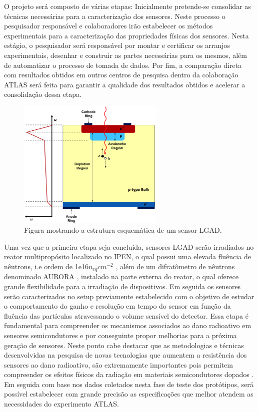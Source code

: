 O projeto será composto de várias etapas: Inicialmente pretende-se consolidar as técnicas necessárias para a caracterização dos sensores. Neste processo o pesquisador responsável e colaboradores irão estabelecer os métodos experimentais para a caracterização das propriedades físicas dos sensores. Nesta estágio, o pesquisador será responsável por montar e certificar os arranjos experimentais, desenhar e construir as partes necessárias para os mesmos, além de automatizar o processo de tomada de dados. Por fim, a comparação direta com resultados obtidos em outros centros de pesquisa dentro da colaboração ATLAS será feita para garantir a qualidade dos resultados obtidos e acelerar a consolidação dessa etapa. 
\begin{figure}
    \centering
    \includegraphics[width=7.0cm]{assets/lgad.png}
    \caption{Figura mostrando a estrutura esquemática de um sensor LGAD.}
    \label{lgad}
\end{figure}

Uma vez que a primeira etapa seja concluída, sensores LGAD serão irradiados no reator multipropósito localizado no IPEN, o qual possui uma elevada fluência de nêutrons, i.e ordem de 1e16$n_{eq}cm{^{-2}}$ \cite{IPEN_REATOR}, além de um difratômetro de nêutrons denominado AURORA \cite{IPEN_AURORA}, instalado na parte externa do reator, o qual oferece grande flexibilidade para a irradiação de dispositivos. Em seguida os sensores serão caracterizados no setup previamente estabelecido com o objetivo de estudar o comportamento do ganho e resolução em tempo do sensor em função da fluência das partículas atravessando o volume sensível do detector. Essa etapa é fundamental para compreender os mecanismos associados ao dano radioativo em sensores semicondutores e por conseguinte propor melhorias para a próxima geração de sensores. 
Neste ponto cabe destacar que as metodologias e técnicas desenvolvidas na pesquisa de novas tecnologias que aumentem a resistência dos sensores ao dano radioativo, são extremamente importantes pois permitem compreender os efeitos físicos da radiação em materiais semicondutores dopados \cite{tdr,JIN_LGAD,NIMA_LGAD}. %
Em seguida com base nos dados coletados nesta fase de teste dos protótipos, será possível estabelecer com grande precisão as especificações que melhor atendem as necessidades do experimento ATLAS. 

